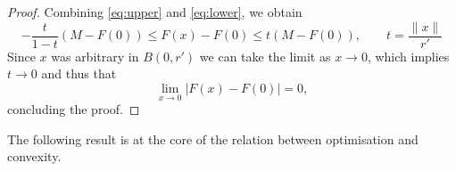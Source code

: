 \begin{proof}
     Combining \eqref{eq:upper} and \eqref{eq:lower}, we obtain
     \begin{equation}
         - \frac{t}{1-t}(M-F(0)) \le F(x)-F(0) \le t(M-F(0)), \qquad t=\frac{\|x\|}{r'}
     \end{equation}
     Since $x$ was arbitrary in $B(0,r')$ we can take the limit as $x\to 0$, which implies $t\to 0$ and thus that
     \begin{equation}
         \lim_{x\to 0}|F(x)-F(0)|=0,
     \end{equation}
     concluding the proof.
 \end{proof}
 
 The following result is at the core of the relation between optimisation and convexity.
 
 
